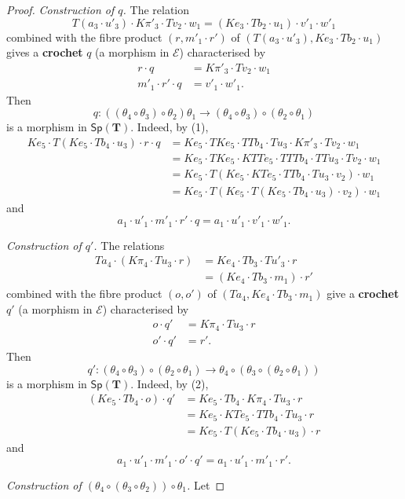 \documentclass[fleqn]{article}
\newcommand{\oldpage}[1]{\marginpar{\footnotesize$\Big\vert$ \textit{p.~#1}}}
\newcommand{\unsure}[1]{{\color{purple}\textbf{#1}}}
\newcommand{\TT}{\mathbf{T}}
\newcommand{\cat}[1]{\mathcal{#1}}
\newcommand{\Cat}[1]{\mathsf{#1}}
\newcommand{\Sp}[1]{\Cat{Sp}(#1)}
\begin{document}
\begin{proof}
  \emph{Construction of $q$.}
  The relation
  \[
    T(a_3\cdot u'_3)\cdot K\pi'_3\cdot Tv_2\cdot w_1
    = (Ke_3\cdot Tb_2\cdot u_1)\cdot v'_1\cdot w'_1
  \]
  combined with the fibre product $(r,m'_1\cdot r')$ of $(T(a_3\cdot u'_3),Ke_3\cdot Tb_2\cdot u_1)$ gives a \unsure{crochet} $q$ (a morphism in $\cat{E}$) characterised by
  \[
    \begin{aligned}
      r\cdot q
      &= K\pi'_3\cdot Tv_2\cdot w_1
    \\m'_1\cdot r'\cdot q
      &= v'_1\cdot w'_1.
    \end{aligned}
    \tag{1}
  \]
  Then
  \[
    q\colon((\theta_4\circ\theta_3)\circ\theta_2)\theta_1
    \to (\theta_4\circ\theta_3)\circ(\theta_2\circ\theta_1)
  \]
  is a morphism in $\Sp{\TT}$.
  Indeed, by (1),
  \[
    \begin{aligned}
      Ke_5\cdot T(Ke_5\cdot Tb_4\cdot u_3)\cdot r\cdot q
      &= Ke_5\cdot TKe_5\cdot TTb_4\cdot Tu_3\cdot K\pi'_3\cdot Tv_2\cdot w_1
    \\&= Ke_5\cdot TKe_5\cdot KTTe_5\cdot TTTb_4\cdot TTu_3\cdot Tv_2\cdot w_1
    \\&= Ke_5\cdot T(Ke_5\cdot KTe_5\cdot TTb_4\cdot Tu_3\cdot v_2)\cdot w_1
    \\&= Ke_5\cdot T(Ke_5\cdot T(Ke_5\cdot Tb_4\cdot u_3)\cdot v_2)\cdot w_1
    \end{aligned}
  \]
  and
  \[
    a_1\cdot u'_1\cdot m'_1\cdot r'\cdot q
    = a_1\cdot u'_1\cdot v'_1\cdot w'_1.
  \]

  \medskip

  \emph{Construction of $q'$.}
  The relations
  \[
    \begin{aligned}
      Ta_4\cdot(K\pi_4\cdot Tu_3\cdot r)
      &= Ke_4\cdot Tb_3\cdot Tu'_3\cdot r
    \\&= (Ke_4\cdot Tb_3\cdot m_1)\cdot r'
    \end{aligned}
  \]
  combined with the fibre product $(o,o')$ of $(Ta_4,Ke_4\cdot Tb_3\cdot m_1)$ give a \unsure{crochet} $q'$ (a morphism in $\cat{E}$) characterised by
  \oldpage{253}
  \[
    \begin{aligned}
      o\cdot q'
      &= K\pi_4\cdot Tu_3\cdot r
    \\o'\cdot q'
      &= r'.
    \end{aligned}
    \tag{2}
  \]
  Then
  \[
    q'\colon(\theta_4\circ\theta_3)\circ(\theta_2\circ\theta_1)
    \to \theta_4\circ(\theta_3\circ(\theta_2\circ\theta_1))
  \]
  is a morphism in $\Sp{\TT}$.
  Indeed, by (2),
  \[
    \begin{aligned}
      (Ke_5\cdot Tb_4\cdot o)\cdot q'
      &= Ke_5\cdot Tb_4\cdot K\pi_4\cdot Tu_3\cdot r
    \\&= Ke_5\cdot KTe_5\cdot TTb_4\cdot Tu_3\cdot r
    \\&= Ke_5\cdot T(Ke_5\cdot Tb_4\cdot u_3)\cdot r
    \end{aligned}
  \]
  and
  \[
    a_1\cdot u'_1\cdot m'_1\cdot o'\cdot q'
    = a_1\cdot u'_1\cdot m'_1\cdot r'.
  \]

  \medskip

  \emph{Construction of $(\theta_4\circ(\theta_3\circ\theta_2))\circ\theta_1$.}
  Let
\end{proof}




\nocite{*}
\printbibliography[heading=bibintoc,title=Bibliography]
\end{document}
